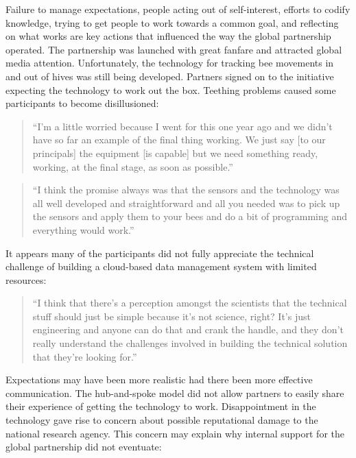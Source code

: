 Failure to manage expectations, people acting out of self-interest, efforts to codify knowledge, trying to get people to work towards a common goal, and reflecting on what works are key actions that influenced the way the global partnership operated. The partnership was launched with great fanfare and attracted global media attention. Unfortunately, the technology for tracking bee movements in and out of hives was still being developed. Partners signed on to the initiative expecting the technology to work out the box. Teething problems caused some participants to become disillusioned:

\begin{quote}
\small
\enquote{I'm a little worried because I went for this one year ago and we didn't have so far an example of the final thing working. We just say [to our principals] the equipment [is capable] but we need something ready, working, at the final stage, as soon as possible.} \\
\end{quote}

\begin{quote}
\small
\enquote{I think the promise always was that the sensors and the technology was all well developed and straightforward and all you needed was to pick up the sensors and apply them to your bees and do a bit of programming and everything would work.} \\
\end{quote}

It appears many of the participants did not fully appreciate the technical challenge of building a cloud-based data management system with limited resources:

\begin{quote}
\small
\enquote{I think that there's a perception amongst the scientists that the technical stuff should just be simple because it's not science, right? It's just engineering and anyone can do that and crank the handle, and they don't really understand the challenges involved in building the technical solution that they're looking for.} \\
\end{quote}

Expectations may have been more realistic had there been more effective communication. The hub-and-spoke model did not allow partners to easily share their experience of getting the technology to work. Disappointment in the technology gave rise to concern about possible reputational damage to the national research agency. This concern may explain why internal support for the global partnership did not eventuate:

